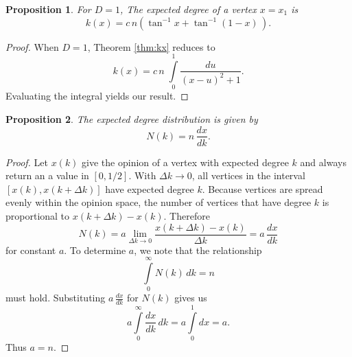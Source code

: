 \documentclass[a4paper,10pt]{article}
\newtheorem{prop}{Proposition}
\begin{document}
\begin{prop}
For $D = 1$, The expected degree of a vertex $x = x_1$ is
 \begin{equation}
 k(x) = c\,n\left(\tan^{-1} x + \tan^{-1} (1-x)\,\right).
\end{equation}
\end{prop}
\begin{proof}
When $D=1$, Theorem \ref{thm:kx} reduces to
\begin{equation}
 k(x) = c\,n\;\int\limits_{0}^{1} \frac{du}{(x - u)^2 + 1}.
\end{equation}
Evaluating the integral yields our result.
\end{proof}
\begin{prop}
 The expected degree distribution is given by
 \begin{equation}
  N(k) = n \,\frac{dx}{dk}.
 \end{equation}
\end{prop}
\begin{proof}
Let $x(k)$ give the opinion of a vertex with expected degree $k$ and always return an a value in $[0, 1/2]$.  
With $\Delta k \to 0$, all vertices in the interval $[x(k), x(k + \Delta k)]$ have expected degree $k$. Because vertices are spread evenly within the opinion space, the number of vertices that have degree $k$ is proportional to $x(k + \Delta k) - x(k)$. Therefore
\begin{equation}
 N(k) = a \lim\limits_{\Delta k \to 0} \frac{x(k + \Delta k) - x(k)}{\Delta k} = a \, \frac{dx}{dk}
\end{equation}
for constant $a$. To determine $a$, we note that the relationship 
\begin{equation}
\label{eqn:Nsum}
 \int\limits_{0}^\infty N(k)\, dk = n
\end{equation}
must hold. Substituting $a \, \frac{dx}{dk}$ for $N(k)$ gives us 
\begin{equation}
 a\int\limits_{0}^\infty \frac{dx}{dk} \, dk = a\int\limits_{0}^1 dx = a.
\end{equation}
Thus $a = n$.
\end{proof}
\end{document}
